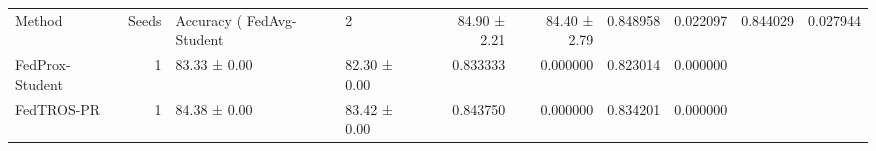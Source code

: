 \begin{tabular}{lrllrrrr}
\toprule
Method & Seeds & Accuracy (%
\midrule
FedAvg-Student & 2 & 84.90 ± 2.21 & 84.40 ± 2.79 & 0.848958 & 0.022097 & 0.844029 & 0.027944 \\
FedProx-Student & 1 & 83.33 ± 0.00 & 82.30 ± 0.00 & 0.833333 & 0.000000 & 0.823014 & 0.000000 \\
FedTROS-PR & 1 & 84.38 ± 0.00 & 83.42 ± 0.00 & 0.843750 & 0.000000 & 0.834201 & 0.000000 \\
\bottomrule
\end{tabular}
